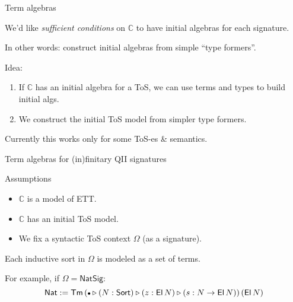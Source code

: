 \documentclass[dvipsnames]{beamer}
\newcommand{\ms}[1]{\mathsf{#1}}
\newcommand{\mbb}[1]{\mathbb{#1}}
\newcommand{\Tm}{\mathsf{Tm}}
\newcommand{\El}{\mathsf{El}}
\newcommand{\Sort}{\mathsf{Sort}}
\newcommand{\ext}{\triangleright}
\newcommand{\emptycon}{\scaleobj{.75}\bullet}
\newcommand{\Nat}{\ms{Nat}}
\newcommand{\mbbC}{\mbb{C}}
\begin{document}
\begin{frame}{Term algebras}

We'd like \emph{sufficient conditions} on $\mbbC$ to have initial algebras
for each signature.
\vspace{1em}

In other words: construct initial algebras from simple ``type formers''.
\vspace{1em}

Idea:
\begin{enumerate}
\item If $\mbbC$ has an initial algebra for a ToS, we can use terms and types
      to build initial algs.
\item We construct the initial ToS model from simpler type formers.
\end{enumerate}
\vspace{1em}

Currently this works only for some ToS-es \& semantics.

\end{frame}

\begin{frame}{Term algebras for (in)finitary QII signatures}

\begin{block}{Assumptions}
\begin{itemize}
\item $\mbbC$ is a model of ETT.
\item $\mbbC$ has an initial ToS model.
\item We fix a syntactic ToS context $\Omega$ (as a signature).
\end{itemize}
\end{block}
\vspace{1em}
Each inductive sort in $\Omega$ is modeled as a set of terms.
\vspace{1em}

For example, if $\Omega = \ms{NatSig}$:
\[  \Nat := \Tm\,(\emptycon\ext(N : \Sort)\ext(z : \El\,N)\ext(s: N \to \El\,N))\,(\El\,N) \]

\end{frame}
\end{document}
